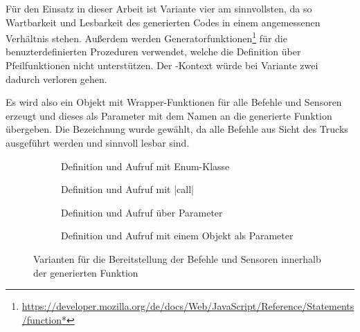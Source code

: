 Für den Einsatz in dieser Arbeit ist Variante vier am sinnvollsten, da so Wartbarkeit und Lesbarkeit des generierten Codes in einem angemessenen Verhältnis stehen. Außerdem werden Generatorfunktionen\footnote{\url{https://developer.mozilla.org/de/docs/Web/JavaScript/Reference/Statements/function*}} für die benuzterdefinierten Prozeduren verwendet, welche die Definition über Pfeilfunktionen nicht unterstützen. Der -Kontext würde bei Variante zwei dadurch verloren gehen.

Es wird also ein Objekt mit Wrapper-Funktionen für alle Befehle und Sensoren erzeugt und dieses als Parameter mit dem Namen  an die generierte Funktion übergeben. Die Bezeichnung  wurde gewählt, da alle Befehle aus Sicht des Trucks ausgeführt werden und  sinnvoll lesbar sind.

\begin{figure}
  \begin{subfigure}[b]{\textwidth}
    
    \caption{Definition und Aufruf mit Enum-Klasse}
    \label{fig:implementation:program:environment:func}
    \vspace{0.5cm}
  \end{subfigure}
  \begin{subfigure}[b]{\textwidth}
    
    \caption{Definition und Aufruf mit \inlinec|call|}
    \label{fig:implementation:program:environment:this}
    \vspace{0.5cm}
  \end{subfigure}
  \begin{subfigure}[b]{\textwidth}
    
    \caption{Definition und Aufruf über Parameter}
    \label{fig:implementation:program:environment:param}
    \vspace{0.5cm}
  \end{subfigure}
  \begin{subfigure}[b]{\textwidth}
    
    \caption{Definition und Aufruf mit einem Objekt als Parameter}
    \label{fig:implementation:program:environment:obj}
  \end{subfigure}
  \caption{Varianten für die Bereitstellung der Befehle und Sensoren innerhalb der generierten Funktion}
  \label{fig:implementation:program:environment}
\end{figure}

